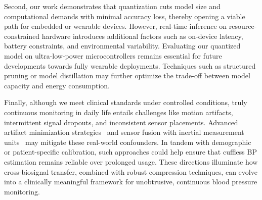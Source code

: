 Second, our work demonstrates that quantization cuts model size and computational demands with minimal accuracy loss, thereby opening a viable path for embedded or wearable devices. However, real-time inference on resource-constrained hardware introduces additional factors such as on-device latency, battery constraints, and environmental variability. Evaluating our quantized model on ultra-low-power microcontrollers remains essential for future developments towards fully wearable deployments. Techniques such as structured pruning or model distillation may further optimize the trade-off between model capacity and energy consumption.

Finally, although we meet clinical standards under controlled conditions, truly continuous monitoring in daily life entails challenges like motion artifacts, intermittent signal dropouts, and inconsistent sensor placements. Advanced artifact minimization strategies~\cite{ingolfsson_minimizing_2024} and sensor fusion with inertial measurement units~\cite{ingolfsson2024brainfusenet} may mitigate these real-world confounders. In tandem with demographic or patient-specific calibration, such approaches could help ensure that cuffless BP estimation remains reliable over prolonged usage. These directions illuminate how cross-biosignal transfer, combined with robust compression techniques, can evolve into a clinically meaningful framework for unobtrusive, continuous blood pressure monitoring. 










